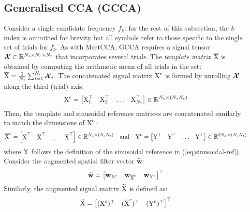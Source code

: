 \subsection{Generalised CCA (GCCA)}
Consider a single candidate frequency $f_k$: for the rest of this subsection, the $k$ index is ommitted for brevity but all symbols refer to those specific to the single set of trials for $f_k$. As with MsetCCA, GCCA requires a signal tensor ${\bm{\mathcal{X}}} \in \mathbb{R}^{N_s \times N_c \times N_t}$ that incorporates several trials. The \textit{template matrix} $\overline{{\textrm{X}}}$ is obtained by computing the arithmetic mean of all trials in the set: $\overline{{\textrm{X}}}= \frac{1}{N_t}\sum_{i=1}^{N_t}{\bm{\mathcal{X}}}_{i}$. The concatenated signal matrix ${\textrm{X}}^{c}$ is formed by unrolling ${\bm{\mathcal{X}}}$ along the third (trial) axis:
\begin{equation}
    {\textrm{X}}^{c} = \begin{bmatrix}
    {\textrm{X}}_1^\top & {\textrm{X}}_2^\top & \dots & {\textrm{X}}_{N_t}^\top
    \end{bmatrix} \in \mathbb{R}^{N_c \times (N_s N_t)} 
\end{equation}
Then, the template and sinusoidal reference matrices are concatenated similarly to match the dimensions of  
${\textrm{X}}^{c}$:
\begin{equation}
    \overline{{\textrm{X}}}^{c} = \begin{bmatrix}
    \overline{{\textrm{X}}}^\top & \overline{{\textrm{X}}}^\top & \dots & \overline{{\textrm{X}}}^\top
    \end{bmatrix} \in \mathbb{R}^{N_c \times (N_s N_t)} \quad \textrm{and} \quad  {\textrm{Y}}^{c} = \begin{bmatrix}
    {\textrm{Y}}^\top & {\textrm{Y}}^\top & \dots & {\textrm{Y}}^\top
    \end{bmatrix} \in \mathbb{R}^{2N_h \times (N_s N_t)}
\end{equation}
where ${\textrm{Y}}$ follows the definition of the sinusoidal reference in (\ref{eq:sinusoidal-ref}). Consider the augmented spatial filter vector $\widetilde{{\mathbf{w}}}$: 
\begin{equation}
\widetilde{{\mathbf{w}}} = \begin{bmatrix}{\mathbf{w}}_{{\textrm{X}}^{c}} & {\mathbf{w}}_{\overline{{\textrm{X}}}^{c}} & {\mathbf{w}}_{{\textrm{Y}}^{c}} \end{bmatrix}^\top 
\end{equation}
Similarly, the augmented signal matrix $\widetilde{{\textrm{X}}}$ is defined as: 
\begin{equation}
\widetilde{{\textrm{X}}} = \begin{bmatrix}({\textrm{X}}^{c})^\top & (\overline{{\textrm{X}}}^{c})^\top & ({\textrm{Y}}^{c})^\top \end{bmatrix}^\top
\end{equation}
